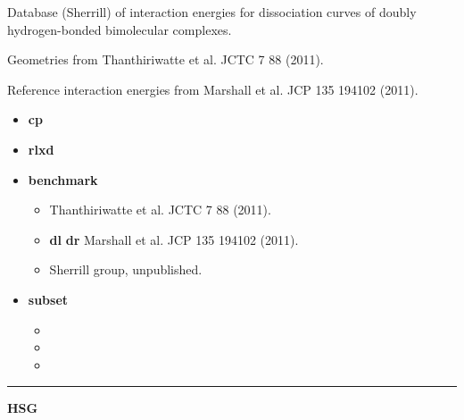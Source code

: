 \documentclass[letterpaper,10pt,english]{sphinxmanual}
\begin{document}
\begin{DUlineblock}{0em}
\item[] Database (Sherrill) of interaction energies for dissociation curves of doubly hydrogen-bonded bimolecular complexes.
\item[] Geometries from Thanthiriwatte et al. JCTC 7 88 (2011).
\item[] Reference interaction energies from Marshall et al. JCP 135 194102 (2011).
\end{DUlineblock}
\begin{itemize}
\item {} 
\textbf{cp}   \textbar{}\textbar{} 

\item {} 
\textbf{rlxd}  \textbar{}\textbar{} 

\item {} 
\textbf{benchmark}
\begin{itemize}
\item {} 
 Thanthiriwatte et al. JCTC 7 88 (2011).

\item {} 
{\color{red}\bfseries{}\textbar{}dl\textbar{}}  {\color{red}\bfseries{}\textbar{}dr\textbar{}} Marshall et al. JCP 135 194102 (2011).

\item {} 
 Sherrill group, unpublished.

\end{itemize}

\item {} 
\textbf{subset}
\begin{itemize}
\item {} 

\item {} 

\item {} 

\end{itemize}

\end{itemize}


\bigskip\hrule{}\bigskip

\label{db:module-HSG}
\textbf{HSG}
\end{document}
